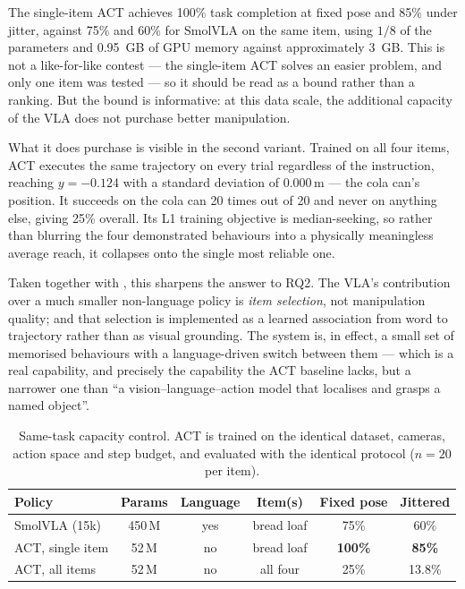 The single-item ACT achieves 100\% task completion at fixed pose and 85\% under
jitter, against 75\% and 60\% for SmolVLA on the same item, using $1/8$ of the
parameters and \SI{0.95}{GB} of GPU memory against approximately \SI{3}{GB}. This is
not a like-for-like contest --- the single-item ACT solves an easier problem, and only
one item was tested --- so it should be read as a bound rather than a ranking. But the
bound is informative: at this data scale, the additional capacity of the VLA does not
purchase better manipulation.

What it does purchase is visible in the second variant. Trained on all four items, ACT
executes the same trajectory on every trial regardless of the instruction, reaching
$y=-0.124$ with a standard deviation of $0.000$\,\si{m} --- the cola can's position.
It succeeds on the cola can 20 times out of 20 and never on anything else, giving 25\%
overall. Its L1 training objective is median-seeking, so rather than blurring the four
demonstrated behaviours into a physically meaningless average reach, it collapses onto
the single most reliable one.

Taken together with , this sharpens the answer to RQ2. The
VLA's contribution over a much smaller non-language policy is \emph{item selection},
not manipulation quality; and that selection is implemented as a learned association
from word to trajectory rather than as visual grounding. The system is, in effect, a
small set of memorised behaviours with a language-driven switch between them --- which
is a real capability, and precisely the capability the ACT baseline lacks, but a
narrower one than ``a vision--language--action model that localises and grasps a named
object''.

\begin{table}[ht]
\caption{Same-task capacity control. ACT is trained on the identical dataset, cameras,
action space and step budget, and evaluated with the identical protocol
($n=20$ per item).}
\begin{center}
\begin{tabular}{lccccc}
\toprule
Policy & Params & Language & Item(s) & Fixed pose & Jittered \\
\midrule
SmolVLA (15k)     & 450\,M & yes & bread loaf & 75\% & 60\% \\
ACT, single item  & 52\,M  & no  & bread loaf & \textbf{100\%} & \textbf{85\%} \\
ACT, all items    & 52\,M  & no  & all four   & 25\% & 13.8\% \\
\bottomrule
\end{tabular}
\end{center}
\label{tab:act}
\end{table}

